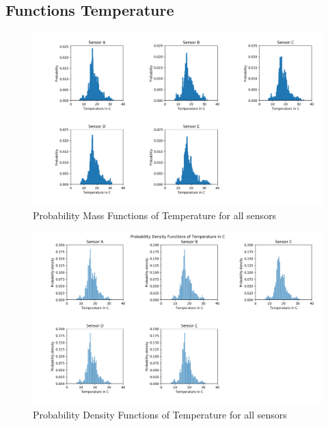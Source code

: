 \documentclass{article}
\begin{document}
        \subsection{Functions Temperature}
            \begin{figure}[H]
                \includegraphics[width=\textwidth]{pmf_temp}
                \caption{Probability Mass Functions of Temperature for all sensors}
            \end{figure}

            \begin{figure}[H]
                \includegraphics[width=\textwidth]{pdf_temp}
                \caption{Probability Density Functions of Temperature for all sensors}
            \end{figure}
\end{document}
